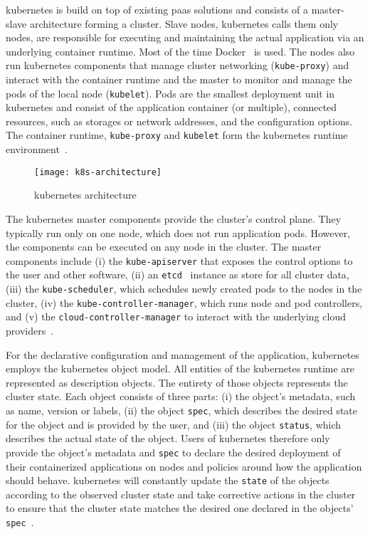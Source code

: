   \Gls{kubernetes} is build on top of existing \gls{paas} solutions and consists of a master-slave architecture forming a cluster.
  Slave nodes, \gls{kubernetes} calls them only nodes, are responsible for executing and maintaining the actual application via an underlying container runtime.
  Most of the time Docker~\cite{docker} is used.
  The nodes also run \gls{kubernetes} components that manage cluster networking (\texttt{kube-proxy}) and interact with the container runtime and the master to monitor and manage the pods of the local node (\texttt{kubelet}).
  Pods are the smallest deployment unit in \gls{kubernetes} and consist of the application container (or multiple), connected resources, such as storages or network addresses, and the configuration options.
  The container runtime, \texttt{kube-proxy} and \texttt{kubelet} form the \gls{kubernetes} runtime environment~\cite{kubernetes}.

  \begin{figure}
    \centering
    \texttt{[image: k8s-architecture]}
    \caption{\Gls{kubernetes} architecture}
    \label{fig:kubernetes-architecture}
  \end{figure}

  The \gls{kubernetes} master components provide the cluster's control plane.
  They typically run only on one node, which does not run application pods.
  However, the components can be executed on any node in the cluster.
  The master components include
  (i) the \texttt{kube-apiserver} that exposes the control options to the user and other software,
  (ii) an \texttt{etcd}~\cite{etcd} instance as store for all cluster data,
  (iii) the \texttt{kube-scheduler}, which schedules newly created pods to the nodes in the cluster,
  (iv) the \texttt{kube-controller-manager}, which runs node and pod controllers, and
  (v) the \texttt{cloud-controller-manager} to interact with the underlying cloud providers~\cite{kubernetes}.

  For the declarative configuration and management of the application, \gls{kubernetes} employs the \gls{kubernetes} object model.
  All entities of the \gls{kubernetes} runtime are represented as description objects.
  The entirety of those objects represents the cluster state.
  Each object consists of three parts:
  (i) the object's metadata, such as name, version or labels,
  (ii) the object \texttt{spec}, which describes the desired state for the object and is provided by the user, and
  (iii) the object \texttt{status}, which describes the actual state of the object.
  Users of \gls{kubernetes} therefore only provide the object's metadata and \texttt{spec} to declare the desired deployment of their containerized applications on nodes and policies around how the application should behave.
  \Gls{kubernetes} will constantly update the \texttt{state} of the objects according to the observed cluster state and take corrective actions in the cluster to ensure that the cluster state matches the desired one declared in the objects' \texttt{spec}~\cite{kubernetes}.

